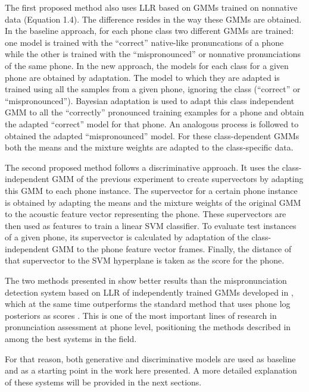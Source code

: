 The first proposed method also uses LLR based on GMMs trained
on nonnative data (Equation 1.4). The difference resides in the way these GMMs are obtained.
In the baseline approach, for each phone class two different GMMs are trained: one model is
trained with the ``correct'' native-like pronuncations of a phone while the other is trained
with the ``mispronounced'' or nonnative pronunciations of the same phone. In the new approach,
the models for each class for a given phone are obtained by adaptation. The model to which they
are adapted is trained using all the samples from a given phone, ignoring the class (``correct''
or ``mispronounced''). Bayesian adaptation \cite{ubm} is used to adapt this class independent
GMM to all the ``correctly'' pronounced training examples for a phone and obtain the adapted
``correct'' model for that phone. An analogous process is followed to obtained the adapted
``mispronounced'' model. For these class-dependent GMMs both the means and the mixture weights 
are adapted to the class-specific data.

The second proposed method follows a discriminative approach. It uses the class-independent
GMM of the previous experiment to create supervectors by adapting this GMM to each phone instance.
The supervector for a certain phone instance is obtained by adapting the means and the mixture
weights of the original GMM to the acoustic feature vector representing the phone.
These supervectors are then used as features to train a linear SVM classifier.
To evaluate test instances of a given phone, its supervector is calculated by adaptation of the class-independent
GMM to the phone feature vector frames. Finally, the distance of that supervector to the SVM
hyperplane is taken as the score for the phone.

The two methods presented in \cite{main} show better results than the mispronunciation
detection system based on LLR of independently trained GMMs developed in
\cite{detection_phone_level_mispronunciation_learning}, which at the same time
outperforms the standard method that uses phone log posteriors
as scores \cite{pronunciation_scoring_phone_segments_instruction}. 
This is one of the most important lines of research in pronunciation assessment 
at phone level, positioning the methods described in \cite{main} among the best
systems in the field. 

For that reason, both generative and discriminative models are used as baseline
and as a starting point in the work here presented. A more detailed explanation of these systems
will be provided in the next sections.


